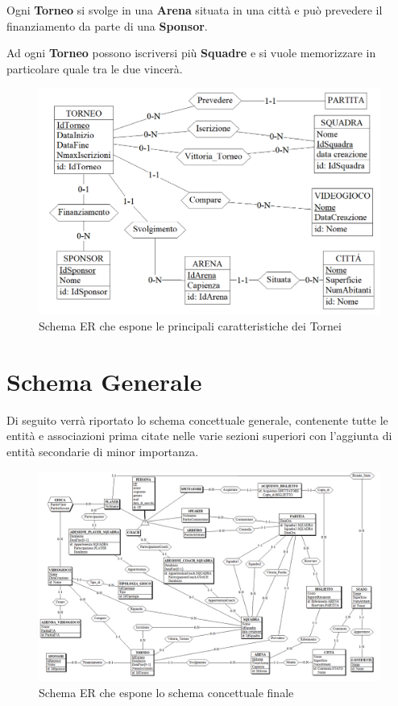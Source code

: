 \documentclass[a4paper,12pt]{report}
\begin{document}
Ogni \textbf{Torneo} si svolge in una \textbf{Arena} situata in una città e può prevedere il finanziamento da parte di una \textbf{Sponsor}.

Ad ogni \textbf{Torneo} possono iscriversi più \textbf{Squadre} e si vuole memorizzare in particolare quale tra le due vincerà.

\begin{figure}[!htb]
	\centerline{\includegraphics[scale=0.6]{img/ER_Tornei.png}}
	\caption{Schema ER che espone le principali caratteristiche dei Tornei}
	\label{img:ER_Tornei}
\end{figure}
\section{Schema Generale}
Di seguito verrà riportato lo schema concettuale generale, contenente tutte le entità e associazioni prima citate nelle varie sezioni superiori con l'aggiunta di entità secondarie di minor importanza.
\begin{figure}[!htb]
	\centerline{\includegraphics[scale=0.55]{img/ER_Generale.png}}
	\caption{Schema ER che espone lo schema concettuale finale}
	\label{img:ER_Generale}
\end{figure}
\end{document}
